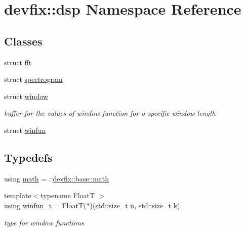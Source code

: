 \hypertarget{namespacedevfix_1_1dsp}{}\section{devfix\+:\+:dsp Namespace Reference}
\label{namespacedevfix_1_1dsp}
\subsection*{Classes}
\begin{DoxyCompactItemize}
\item 
struct \hyperlink{structdevfix_1_1dsp_1_1fft}{fft}
\item 
struct \hyperlink{structdevfix_1_1dsp_1_1spectrogram}{spectrogram}
\item 
struct \hyperlink{structdevfix_1_1dsp_1_1window}{window}
\begin{DoxyCompactList}\small\item\em buffer for the values of window function for a specific window length \end{DoxyCompactList}\item 
struct \hyperlink{structdevfix_1_1dsp_1_1winfun}{winfun}
\end{DoxyCompactItemize}
\subsection*{Typedefs}
\begin{DoxyCompactItemize}
\item 
using \hyperlink{namespacedevfix_1_1dsp_a4d41815e9c6481fb760733a11d5b633a}{math} = \+::\hyperlink{structdevfix_1_1base_1_1math}{devfix\+::base\+::math}
\item 
{\footnotesize template$<$typename FloatT $>$ }\\using \hyperlink{namespacedevfix_1_1dsp_a6667d1bec03c0d82f87521b87d3fcf24}{winfun\+\_\+t} = FloatT($\ast$)(std\+::size\+\_\+t n, std\+::size\+\_\+t k)
\begin{DoxyCompactList}\small\item\em type for window functions \end{DoxyCompactList}\end{DoxyCompactItemize}
